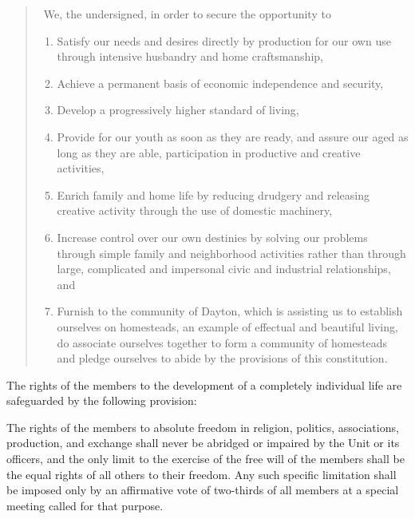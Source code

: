 \documentclass{book}
\begin{document}
\begin{quotation}\
	We, the undersigned, in order to secure the opportunity to

	\begin{enumerate}
		\item Satisfy our needs and desires directly by production for our own use through intensive husbandry and home craftsmanship,

		\item Achieve a permanent basis of economic independence and security,

		\item Develop a progressively higher standard of living,

		\item Provide for our youth as soon as they are ready, and assure our aged as long as they are able, participation in productive and creative activities,

		\item Enrich family and home life by reducing drudgery and releasing creative activity through the use of domestic machinery,

		\item Increase control over our own destinies by solving our problems through simple family and neighborhood activities rather than through large, complicated and impersonal civic and industrial relationships, and

		\item Furnish to the community of Dayton, which is assisting us to establish ourselves on homesteads, an example of effectual and beautiful living, do associate ourselves together to form a community of homesteads and pledge ourselves to abide by the provisions of this constitution.

	\end{enumerate}

\end{quotation}

The rights of the members to the development of a completely individual life are safeguarded by the following provision:

The rights of the members to absolute freedom in religion, politics, associations, production, and exchange shall never be abridged or impaired by the Unit or its officers, and the only limit to the exercise of the free will of the members shall be the equal rights of all others to their freedom. Any such specific limitation shall be imposed only by an affirmative vote of two-thirds of all members at a special meeting called for that purpose.
\end{document}
